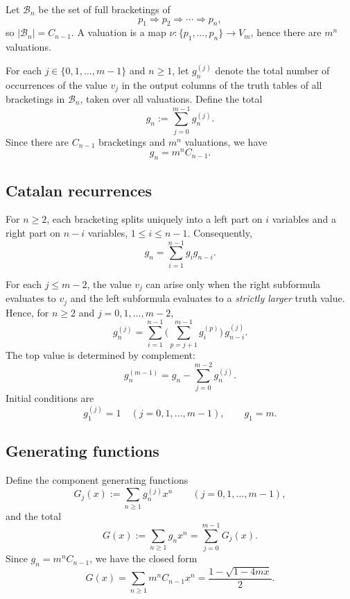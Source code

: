 \documentclass[11pt]{article}
\begin{document}
Let \(\mathcal{B}_n\) be the set of full bracketings of
\[
p_1\Rightarrow p_2\Rightarrow\cdots\Rightarrow p_n,
\]
so \(|\mathcal{B}_n|=C_{n-1}\). A valuation is a map \(\nu:\{p_1,\dots,p_n\}\to V_m\), hence there are \(m^n\) valuations.

For each \(j\in\{0,1,\dots,m-1\}\) and \(n\ge1\), let \(g_n^{(j)}\) denote the total number of occurrences of the value \(v_j\) in the output columns of the truth tables of all bracketings in \(\mathcal{B}_n\), taken over all valuations. Define the total
\[
g_n:=\sum_{j=0}^{m-1} g_n^{(j)}.
\]
Since there are \(C_{n-1}\) bracketings and \(m^n\) valuations, we have
\[
g_n=m^n C_{n-1}.
\]



\subsection*{Catalan recurrences}
For \(n\ge2\), each bracketing splits uniquely into a left part on \(i\) variables and a right part on \(n-i\) variables, \(1\le i\le n-1\). Consequently,
\[
g_n=\sum_{i=1}^{n-1} g_i g_{n-i}.
\]

For each \(j\le m-2\), the value \(v_j\) can arise only when the right subformula evaluates to \(v_j\) and the left subformula evaluates to a \emph{strictly larger} truth value. Hence, for \(n\ge2\) and \(j=0,1,\dots,m-2\),
\begin{equation}\label{eq:godel-m-rec}
g_n^{(j)}=\sum_{i=1}^{n-1}\Big(\sum_{p=j+1}^{m-1} g_i^{(p)}\Big)\, g_{n-i}^{(j)}.
\end{equation}
The top value is determined by complement:
\begin{equation}\label{eq:godel-m-top}
g_n^{(m-1)}=g_n-\sum_{j=0}^{m-2} g_n^{(j)}.
\end{equation}
Initial conditions are
\[
g_1^{(j)}=1\quad (j=0,1,\dots,m-1),\qquad g_1=m.
\]

\subsection*{Generating functions}
Define the component generating functions
\[
G_j(x):=\sum_{n\ge1} g_n^{(j)}x^n\qquad (j=0,1,\dots,m-1),
\]
and the total
\[
G(x):=\sum_{n\ge1} g_n x^n=\sum_{j=0}^{m-1}G_j(x).
\]
Since \(g_n=m^n C_{n-1}\), we have the closed form
\begin{equation}\label{eq:godel-m-G}
G(x)=\sum_{n\ge1}m^nC_{n-1}x^n=\frac{1-\sqrt{1-4mx}}{2}.
\end{equation}
\end{document}
